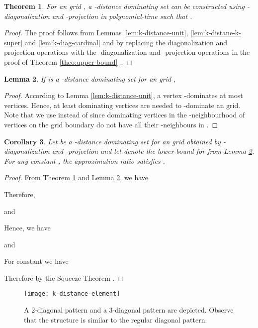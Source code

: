 \documentclass[letterpaper, 10pt, conference]{ieeeconf}
\newtheorem{theorem}{Theorem}[section]
\newtheorem{corollary}[theorem]{Corollary}
\newtheorem{lemma}[theorem]{Lemma}
\theoremstyle{definition}
\theoremstyle{remark}
\begin{document}
\begin{theorem}
\label{theo:upper-bound-k-dist}
For an  grid , a -distance dominating set  can be constructed using -diagonalization and -projection in polynomial-time such that .
\end{theorem}

\begin{proof}
The proof follows from Lemmas \ref{lem:k-distance-unit}, \ref{lem:k-distane-k-super} and \ref{lem:k-diag-cardinal} and by replacing the diagonalization and projection operations with the -diagonalization and -projection operations in the proof of Theorem \ref{theo:upper-bound}~\cite{TYC'92}.
\end{proof}

\begin{lemma}
\label{lem:lower-bound-k-dist}
If  is a -distance dominating set for an  grid , 
\end{lemma}

\begin{proof}
According to Lemma \ref{lem:k-distance-unit}, a vertex  -dominates at most  vertices.
Hence, at least  dominating vertices are needed to -dominate an  grid. Note that we use  instead of  since dominating vertices in the -neighbourhood of vertices on the grid boundary do not have all their -neighbours in .
\end{proof}

\begin{corollary}
\label{cor:upper-lower}
Let  be a -distance dominating set for an  grid  obtained by -diagonalization and -projection and let  denote the lower-bound for  from Lemma \ref{lem:lower-bound-k-dist}. For any constant , the approximation ratio  satisfies .
\end{corollary}

\begin{proof}
From Theorem \ref{theo:upper-bound-k-dist} and Lemma
\ref{lem:lower-bound-k-dist}, we have

Therefore,

and

Hence, we have

and 

For constant  we have


Therefore by the Squeeze Theorem . \end{proof}


\begin{figure}[t]
\texttt{[image: k-distance-element]}
\vspace{-0.5cm}
\caption{A 2-diagonal pattern and a 3-diagonal pattern are depicted. Observe that the structure is similar to the regular diagonal pattern.}
\label{fig:k-distance-elem}
\end{figure}
\end{document}
